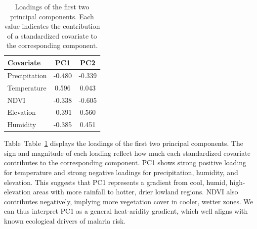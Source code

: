 \documentclass[
  letterpaper,
]{krantz}
\begin{document}
\begin{longtable}[]{@{}lcc@{}}

\caption{\label{tbl-pca-loadings}Loadings of the first two principal
components. Each value indicates the contribution of a standardized
covariate to the corresponding component.}

\tabularnewline

\toprule\noalign{}
Covariate & PC1 & PC2 \\
\midrule\noalign{}
\endhead
\bottomrule\noalign{}
\endlastfoot
Precipitation & -0.480 & -0.339 \\
Temperature & 0.596 & 0.043 \\
NDVI & -0.338 & -0.605 \\
Elevation & -0.391 & 0.560 \\
Humidity & -0.385 & 0.451 \\

\end{longtable}

Table~Table~\ref{tbl-pca-loadings} displays the loadings of the first
two principal components. The sign and magnitude of each loading reflect
how much each standardized covariate contributes to the corresponding
component. PC1 shows strong positive loading for temperature and strong
negative loadings for precipitation, humidity, and elevation. This
suggests that PC1 represents a gradient from cool, humid, high-elevation
areas with more rainfall to hotter, drier lowland regions. NDVI also
contributes negatively, implying more vegetation cover in cooler, wetter
zones. We can thus interpret PC1 as a general heat-aridity gradient,
which well aligns with known ecological drivers of malaria risk.
\end{document}
